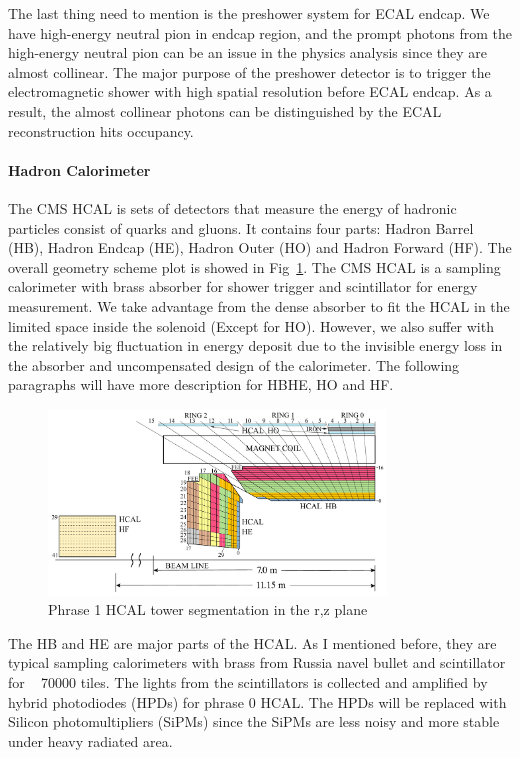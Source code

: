 The last thing need to mention is the preshower system for ECAL endcap. We have high-energy neutral pion in endcap region, and the prompt photons from the high-energy neutral pion can be an issue in the physics analysis since they are almost collinear. The major purpose of the preshower detector is to trigger the electromagnetic shower with high spatial resolution before ECAL endcap. As a result, the almost collinear photons can be distinguished by the ECAL reconstruction hits occupancy. 

\paragraph{Hadron Calorimeter}

The CMS HCAL is sets of detectors that measure the energy of hadronic particles consist of quarks and gluons. It contains four parts: Hadron Barrel (HB), Hadron Endcap (HE), Hadron Outer (HO) and Hadron Forward (HF). The overall geometry scheme plot is showed in Fig~\ref{fig:c3cms2dhcal}. The CMS HCAL is a sampling calorimeter with brass absorber for shower trigger and scintillator for energy measurement. We take advantage from the dense absorber to fit the HCAL in the limited space inside the solenoid (Except for HO). However, we also suffer with the relatively big fluctuation in energy deposit due to the invisible energy loss in the absorber and uncompensated design of the calorimeter. The following paragraphs will have more description for HBHE, HO and HF.

\begin{figure}[htbp]
 \begin{center}
  \includegraphics[width=0.8\textwidth]{figures/c3/c3_cms_2dhcal.pdf}
 \end{center}
 \caption{Phrase 1 HCAL tower segmentation in the r,z plane}
 \label{fig:c3cms2dhcal}
\end{figure}

The HB and HE are major parts of the HCAL. As I mentioned before, they are typical sampling calorimeters with brass from Russia navel bullet and scintillator for ~ 70000 tiles. The lights from the scintillators is collected and amplified by hybrid photodiodes (HPDs) for phrase 0 HCAL. The HPDs will be replaced with Silicon photomultipliers (SiPMs) since the SiPMs are less noisy and more stable under heavy radiated area. 

